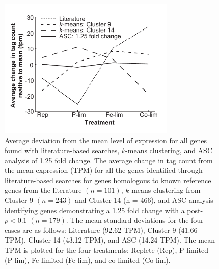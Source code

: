 \begin{figure}[h!]
  \centering
    \includegraphics[width=0.75\textwidth]{Images/C2_Figure2_v6.pdf}
    \caption[Average deviation from the mean level of expression for putative reference genes]{Average deviation from the mean level of expression for all genes found with literature-based searches, $k$-means clustering, and ASC analysis of 1.25 fold change. The average change in tag count from the mean expression (TPM) for all the genes identified through literature-based searches for genes homologous to known reference genes from the literature $(n = 101)$, $k$-means clustering from Cluster 9 $(n = 243)$ and Cluster 14 (n = 466), and ASC analysis identifying genes demonstrating a 1.25 fold change with a post-$p < 0.1$ $(n = 179)$. The mean standard deviations for the four cases are as follows: Literature (92.62 TPM), Cluster 9 (41.66 TPM), Cluster 14 (43.12 TPM), and ASC (14.24 TPM). The mean TPM is plotted for the four treatments: Replete (Rep), P-limited (P-lim), Fe-limited (Fe-lim), and co-limited (Co-lim).}
  \label{fig:c2f2}
\end{figure}

